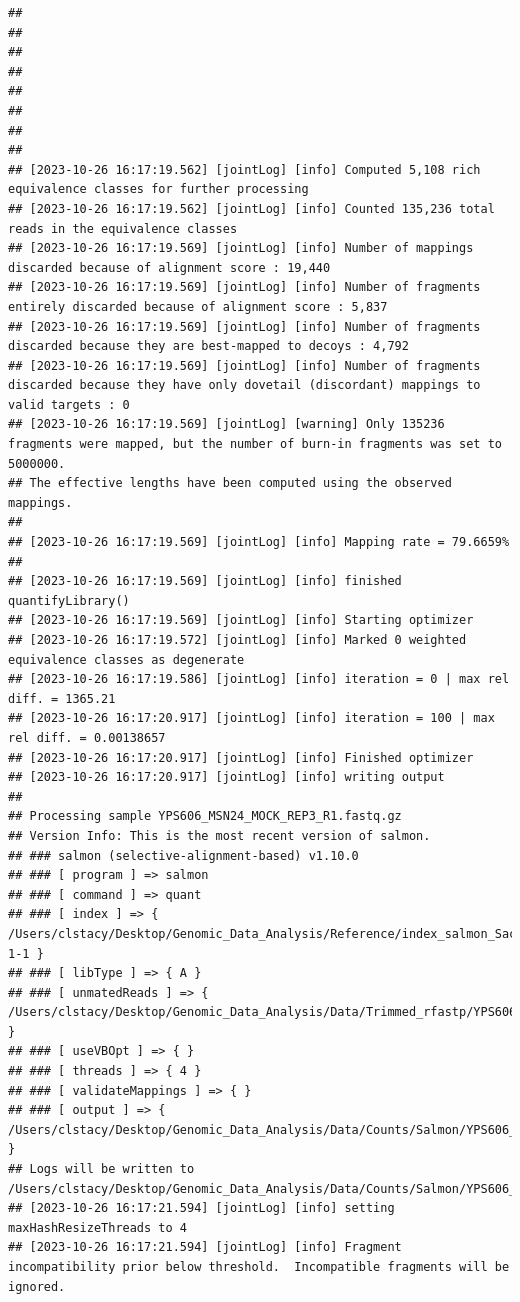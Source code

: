\documentclass[
]{book}
\begin{document}
\begin{verbatim}
## 
## 
## 
## 
## 
## 
## 
## 
## [2023-10-26 16:17:19.562] [jointLog] [info] Computed 5,108 rich equivalence classes for further processing
## [2023-10-26 16:17:19.562] [jointLog] [info] Counted 135,236 total reads in the equivalence classes 
## [2023-10-26 16:17:19.569] [jointLog] [info] Number of mappings discarded because of alignment score : 19,440
## [2023-10-26 16:17:19.569] [jointLog] [info] Number of fragments entirely discarded because of alignment score : 5,837
## [2023-10-26 16:17:19.569] [jointLog] [info] Number of fragments discarded because they are best-mapped to decoys : 4,792
## [2023-10-26 16:17:19.569] [jointLog] [info] Number of fragments discarded because they have only dovetail (discordant) mappings to valid targets : 0
## [2023-10-26 16:17:19.569] [jointLog] [warning] Only 135236 fragments were mapped, but the number of burn-in fragments was set to 5000000.
## The effective lengths have been computed using the observed mappings.
## 
## [2023-10-26 16:17:19.569] [jointLog] [info] Mapping rate = 79.6659%
## 
## [2023-10-26 16:17:19.569] [jointLog] [info] finished quantifyLibrary()
## [2023-10-26 16:17:19.569] [jointLog] [info] Starting optimizer
## [2023-10-26 16:17:19.572] [jointLog] [info] Marked 0 weighted equivalence classes as degenerate
## [2023-10-26 16:17:19.586] [jointLog] [info] iteration = 0 | max rel diff. = 1365.21
## [2023-10-26 16:17:20.917] [jointLog] [info] iteration = 100 | max rel diff. = 0.00138657
## [2023-10-26 16:17:20.917] [jointLog] [info] Finished optimizer
## [2023-10-26 16:17:20.917] [jointLog] [info] writing output 
## 
## Processing sample YPS606_MSN24_MOCK_REP3_R1.fastq.gz
## Version Info: This is the most recent version of salmon.
## ### salmon (selective-alignment-based) v1.10.0
## ### [ program ] => salmon 
## ### [ command ] => quant 
## ### [ index ] => { /Users/clstacy/Desktop/Genomic_Data_Analysis/Reference/index_salmon_Saccharomyces_cerevisiae.R64-1-1 }
## ### [ libType ] => { A }
## ### [ unmatedReads ] => { /Users/clstacy/Desktop/Genomic_Data_Analysis/Data/Trimmed_rfastp/YPS606_MSN24_MOCK_REP3_R1.fastq.gz }
## ### [ useVBOpt ] => { }
## ### [ threads ] => { 4 }
## ### [ validateMappings ] => { }
## ### [ output ] => { /Users/clstacy/Desktop/Genomic_Data_Analysis/Data/Counts/Salmon/YPS606_MSN24_MOCK_REP3_R1.fastq.gz_quant }
## Logs will be written to /Users/clstacy/Desktop/Genomic_Data_Analysis/Data/Counts/Salmon/YPS606_MSN24_MOCK_REP3_R1.fastq.gz_quant/logs
## [2023-10-26 16:17:21.594] [jointLog] [info] setting maxHashResizeThreads to 4
## [2023-10-26 16:17:21.594] [jointLog] [info] Fragment incompatibility prior below threshold.  Incompatible fragments will be ignored.

\end{verbatim}
\end{document}

